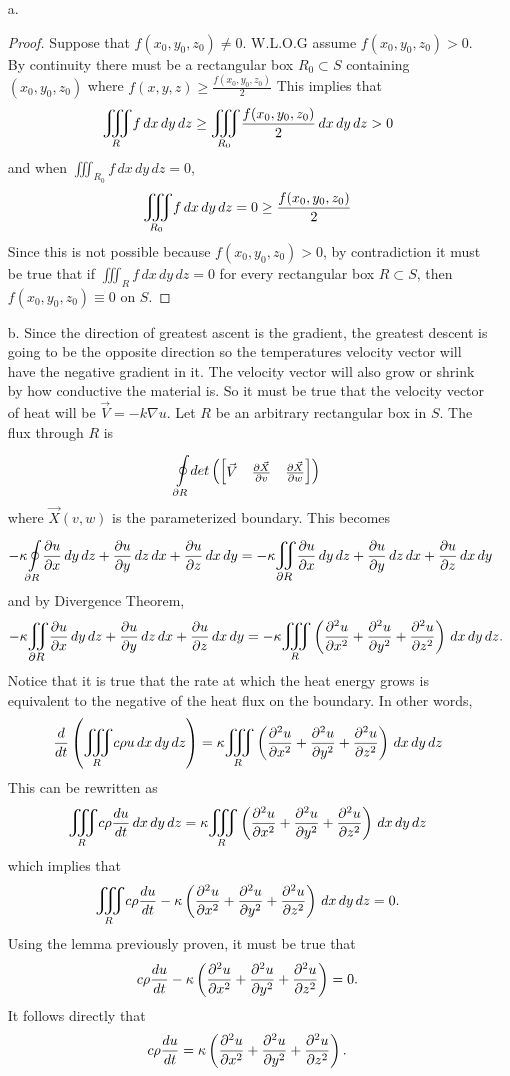 \documentclass[titlepage]{article}
\begin{document}
\begin{solution}
\begin{itemize}
\item[a.] 
\begin{proof}
Suppose that $f(x_0,y_0,z_0) \neq 0 $. W.L.O.G assume $f(x_0,y_0,z_0) > 0$. By continuity there must be a rectangular box $R_0 \subset S$ containing $(x_0,y_0,z_0)$ where $f(x,y,z) \geq \frac{f(x_0,y_0,z_0)}{2}$ 
This implies that
$$\mathlarger\iiint_{R} f\,dx\,dy\,dz \geq \mathlarger\iiint_{R_0} \frac{f(x_0,y_0,z_0)}{2}\,dx\,dy\,dz > 0$$
and when $\iiint_{R_0} f\,dx\,dy\,dz = 0$,
$$\mathlarger\iiint_{R_0} f\,dx\,dy\,dz = 0 \geq \frac{f(x_0,y_0,z_0)}{2}$$
Since this is not possible because $f(x_0,y_0,z_0) > 0$, by contradiction it must be true that if
$\iiint_{R} f\,dx\,dy\,dz = 0$ for every rectangular box $R \subset S$, then $f(x_0,y_0,z_0) \equiv 0$ on $S$.
\end{proof}
\item[b.] 
Since the direction of greatest ascent is the gradient, the greatest descent is going to be the opposite direction so the temperatures velocity vector will have the negative gradient in it. The velocity vector will also grow or shrink by how conductive the material is. So it must be true that the velocity vector of heat will be $\vec{V} = -k\nabla u$.
Let $R$ be an arbitrary rectangular box in $S$. The flux through $R$ is
$$\boint{\p R}{} det\left(\bmat{\vec{V} & \frac{\p \vec{X}}{\p v} & \frac{\p \vec{X}}{\p w}}\right)$$
where $\vec{X}(v,w)$ is the parameterized boundary. This becomes
$$-\kappa\boint{\p R}{} \frac{\p u}{\p x}\,dy\,dz + \frac{\p u}{\p y}\,dz\,dx + \frac{\p u}{\p z}\,dx\,dy =
-\kappa\bigiint{\p R}{} \frac{\p u}{\p x}\,dy\,dz + \frac{\p u}{\p y}\,dz\,dx + \frac{\p u}{\p z}\,dx\,dy$$
and by Divergence Theorem,
$$-\kappa\bigiint{\p R}{} \frac{\p u}{\p x}\,dy\,dz + \frac{\p u}{\p y}\,dz\,dx + \frac{\p u}{\p z}\,dx\,dy =
 -\kappa\mathlarger\iiint_{R} \left(\frac{\p^2 u}{\p x^2} + \frac{\p^2 u}{\p y^2} + \frac{\p^2 u}{\p z^2}\right)\,dx\,dy\,dz.$$
Notice that it is true that the rate at which the heat energy grows is equivalent to the negative of the heat flux on the boundary. 
 In other words, 
 $$\frac{d}{dt}\left(\mathlarger\iiint_{R} c\rho u\,dx\,dy\,dz\right) 
 = \kappa\mathlarger\iiint_{R} \left(\frac{\p^2 u}{\p x^2} + \frac{\p^2 u}{\p y^2} + \frac{\p^2 u}{\p z^2}\right)\,dx\,dy\,dz$$
This can be rewritten as
$$ \mathlarger\iiint_{R} c\rho \frac{d u}{d t}\,dx\,dy\,dz = \kappa\mathlarger\iiint_{R} \left(\frac{\p^2 u}{\p x^2} + \frac{\p^2 u}{\p y^2} + \frac{\p^2 u}{\p z^2}\right)\,dx\,dy\,dz$$
which implies that
$$\mathlarger\iiint_{R} c\rho \frac{d u}{d t} - \kappa\left(\frac{\p^2 u}{\p x^2} + \frac{\p^2 u}{\p y^2} + \frac{\p^2 u}{\p z^2}\right)\,dx\,dy\,dz = 0.$$
Using the lemma previously proven, it must be true that
$$c\rho \frac{d u}{d t} - \kappa\left(\frac{\partial^2 u}{\partial x^2}+ \frac{\partial^2 u}{\partial y^2} + \frac{\partial^2 u}{\partial z^2}\right) = 0.$$
It follows directly that
$$c\rho \frac{d u}{d t} = \kappa\left(\frac{\partial^2 u}{\partial x^2} + \frac{\partial^2 u}{\partial y^2} + \frac{\partial^2 u}{\partial z^2}\right).$$
\end{itemize}
\end{solution}
\end{document}
